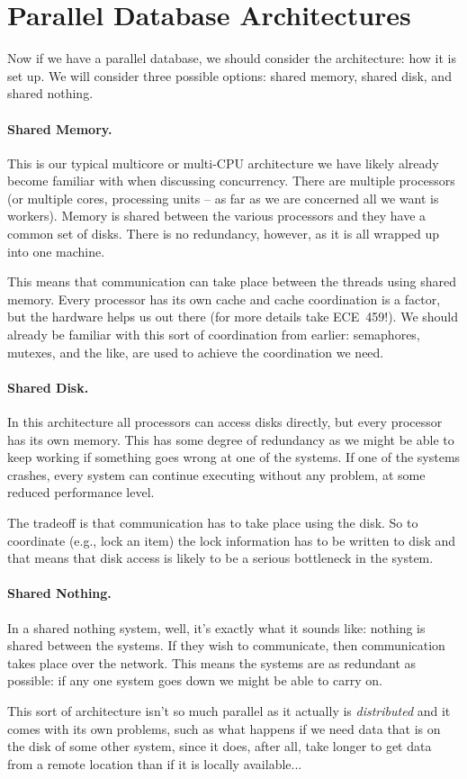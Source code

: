 \section*{Parallel Database Architectures}

Now if we have a parallel database, we should consider the architecture: how it is set up. We will consider three possible options: shared memory, shared disk, and shared nothing.

\paragraph{Shared Memory.} This is our typical multicore or multi-CPU architecture we have likely already become familiar with when discussing concurrency. There are multiple processors (or multiple cores, processing units -- as far as we are concerned all we want is workers). Memory is shared between the various processors and they have a common set of disks. There is no redundancy, however, as it is all wrapped up into one machine.

This means that communication can take place between the threads using shared memory. Every processor has its own cache and cache coordination is a factor, but the hardware helps us out there (for more details take ECE~459!). We should already be familiar with this sort of coordination from earlier: semaphores, mutexes, and the like, are used to achieve the coordination we need.

\paragraph{Shared Disk.} In this architecture all processors can access disks directly, but every processor has its own memory. This has some degree of redundancy as we might be able to keep working if something goes wrong at one of the systems. If one of the systems crashes, every system can continue executing without any problem, at some reduced performance level. 

The tradeoff is that communication has to take place using the disk. So to coordinate (e.g., lock an item) the lock information has to be written to disk and that means that disk access is likely to be a serious bottleneck in the system.

\paragraph{Shared Nothing.} In a shared nothing system, well, it's exactly what it sounds like: nothing is shared between the systems. If they wish to communicate, then communication takes place over the network. This means the systems are as redundant as possible: if any one system goes down we might be able to carry on. 

This sort of architecture isn't so much parallel as it actually is \textit{distributed} and it comes with its own problems, such as what happens if we need data that is on the disk of some other system, since it does, after all, take longer to get data from a remote location than if it is locally available...




